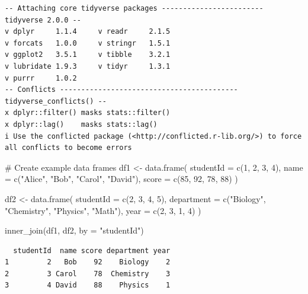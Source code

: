 \documentclass[
  letterpaper,
  DIV=11,
  numbers=noendperiod]{scrartcl}
\newenvironment{Shaded}{\begin{snugshade}}{\end{snugshade}}
\newcommand{\AttributeTok}[1]{\textcolor[rgb]{0.40,0.45,0.13}{#1}}
\newcommand{\CommentTok}[1]{\textcolor[rgb]{0.37,0.37,0.37}{#1}}
\newcommand{\DecValTok}[1]{\textcolor[rgb]{0.68,0.00,0.00}{#1}}
\newcommand{\FunctionTok}[1]{\textcolor[rgb]{0.28,0.35,0.67}{#1}}
\newcommand{\NormalTok}[1]{\textcolor[rgb]{0.00,0.23,0.31}{#1}}
\newcommand{\OtherTok}[1]{\textcolor[rgb]{0.00,0.23,0.31}{#1}}
\newcommand{\StringTok}[1]{\textcolor[rgb]{0.13,0.47,0.30}{#1}}
\begin{document}
\begin{verbatim}
-- Attaching core tidyverse packages ------------------------ tidyverse 2.0.0 --
v dplyr     1.1.4     v readr     2.1.5
v forcats   1.0.0     v stringr   1.5.1
v ggplot2   3.5.1     v tibble    3.2.1
v lubridate 1.9.3     v tidyr     1.3.1
v purrr     1.0.2     
-- Conflicts ------------------------------------------ tidyverse_conflicts() --
x dplyr::filter() masks stats::filter()
x dplyr::lag()    masks stats::lag()
i Use the conflicted package (<http://conflicted.r-lib.org/>) to force all conflicts to become errors
\end{verbatim}

\begin{Shaded}
\begin{Highlighting}[]
\CommentTok{\# Create example data frames}
\NormalTok{df1 }\OtherTok{\textless{}{-}} \FunctionTok{data.frame}\NormalTok{(}
  \AttributeTok{studentId =} \FunctionTok{c}\NormalTok{(}\DecValTok{1}\NormalTok{, }\DecValTok{2}\NormalTok{, }\DecValTok{3}\NormalTok{, }\DecValTok{4}\NormalTok{),}
  \AttributeTok{name =} \FunctionTok{c}\NormalTok{(}\StringTok{"Alice"}\NormalTok{, }\StringTok{"Bob"}\NormalTok{, }\StringTok{"Carol"}\NormalTok{, }\StringTok{"David"}\NormalTok{),}
  \AttributeTok{score =} \FunctionTok{c}\NormalTok{(}\DecValTok{85}\NormalTok{, }\DecValTok{92}\NormalTok{, }\DecValTok{78}\NormalTok{, }\DecValTok{88}\NormalTok{)}
\NormalTok{)}

\NormalTok{df2 }\OtherTok{\textless{}{-}} \FunctionTok{data.frame}\NormalTok{(}
  \AttributeTok{studentId =} \FunctionTok{c}\NormalTok{(}\DecValTok{2}\NormalTok{, }\DecValTok{3}\NormalTok{, }\DecValTok{4}\NormalTok{, }\DecValTok{5}\NormalTok{),}
  \AttributeTok{department =} \FunctionTok{c}\NormalTok{(}\StringTok{"Biology"}\NormalTok{, }\StringTok{"Chemistry"}\NormalTok{, }\StringTok{"Physics"}\NormalTok{, }\StringTok{"Math"}\NormalTok{),}
  \AttributeTok{year =} \FunctionTok{c}\NormalTok{(}\DecValTok{2}\NormalTok{, }\DecValTok{3}\NormalTok{, }\DecValTok{1}\NormalTok{, }\DecValTok{4}\NormalTok{)}
\NormalTok{)}

\FunctionTok{inner\_join}\NormalTok{(df1, df2, }\AttributeTok{by =} \StringTok{"studentId"}\NormalTok{)}
\end{Highlighting}
\end{Shaded}

\begin{verbatim}
  studentId  name score department year
1         2   Bob    92    Biology    2
2         3 Carol    78  Chemistry    3
3         4 David    88    Physics    1
\end{verbatim}
\end{document}
